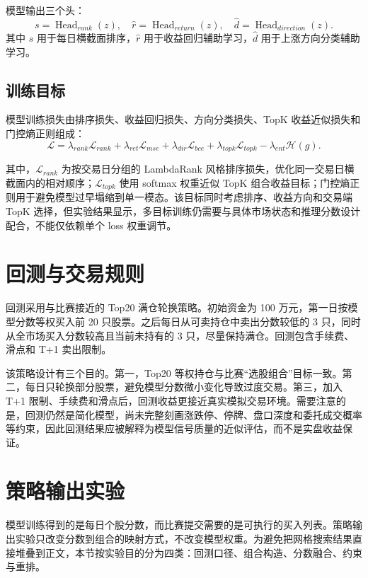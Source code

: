 \documentclass[UTF8,a4paper,12pt,fontset=none]{ctexart}
\begin{document}
模型输出三个头：
\[
  s=\operatorname{Head}_{rank}(z),\quad
  \hat{r}=\operatorname{Head}_{return}(z),\quad
  \hat{d}=\operatorname{Head}_{direction}(z).
\]
其中 $s$ 用于每日横截面排序，$\hat{r}$ 用于收益回归辅助学习，$\hat{d}$ 用于上涨方向分类辅助学习。

\subsection{训练目标}

模型训练损失由排序损失、收益回归损失、方向分类损失、TopK 收益近似损失和门控熵正则组成：
\[
\mathcal{L}
=
\lambda_{rank}\mathcal{L}_{rank}
+\lambda_{ret}\mathcal{L}_{mse}
+\lambda_{dir}\mathcal{L}_{bce}
+\lambda_{topk}\mathcal{L}_{topk}
-\lambda_{ent}\mathcal{H}(g).
\]

其中，$\mathcal{L}_{rank}$ 为按交易日分组的 LambdaRank 风格排序损失，优化同一交易日横截面内的相对顺序；$\mathcal{L}_{topk}$ 使用 softmax 权重近似 TopK 组合收益目标；门控熵正则用于避免模型过早塌缩到单一模态。该目标同时考虑排序、收益方向和交易端 TopK 选择，但实验结果显示，多目标训练仍需要与具体市场状态和推理分数设计配合，不能仅依赖单个 loss 权重调节。

\section{回测与交易规则}

回测采用与比赛接近的 Top20 满仓轮换策略。初始资金为 100 万元，第一日按模型分数等权买入前 20 只股票。之后每日从可卖持仓中卖出分数较低的 3 只，同时从全市场买入分数较高且当前未持有的 3 只，尽量保持满仓。回测包含手续费、滑点和 T+1 卖出限制。

该策略设计有三个目的。第一，Top20 等权持仓与比赛“选股组合”目标一致。第二，每日只轮换部分股票，避免模型分数微小变化导致过度交易。第三，加入 T+1 限制、手续费和滑点后，回测收益更接近真实模拟交易环境。需要注意的是，回测仍然是简化模型，尚未完整刻画涨跌停、停牌、盘口深度和委托成交概率等约束，因此回测结果应被解释为模型信号质量的近似评估，而不是实盘收益保证。

\section{策略输出实验}

模型训练得到的是每日个股分数，而比赛提交需要的是可执行的买入列表。策略输出实验只改变分数到组合的映射方式，不改变模型权重。为避免把网格搜索结果直接堆叠到正文，本节按实验目的分为四类：回测口径、组合构造、分数融合、约束与重排。
\end{document}
